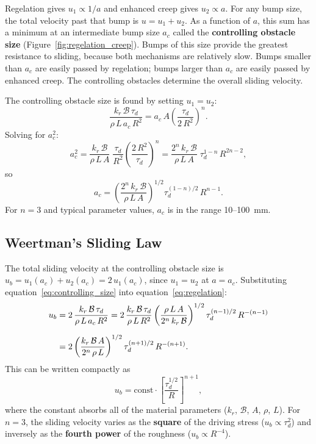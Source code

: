 \documentclass[11pt]{article}
\begin{document}
Regelation gives $u_1 \propto 1/a$ and enhanced creep gives $u_2 \propto a$.  For any bump size, the total velocity past that bump is $u = u_1 + u_2$.  As a function of $a$, this sum has a minimum at an intermediate bump size $a_c$ called the \textbf{controlling obstacle size} (Figure~\ref{fig:regelation_creep}).  Bumps of this size provide the greatest resistance to sliding, because both mechanisms are relatively slow.  Bumps smaller than $a_c$ are easily passed by regelation; bumps larger than $a_c$ are easily passed by enhanced creep.  The controlling obstacles determine the overall sliding velocity.

\medskip
\noindent The controlling obstacle size is found by setting $u_1 = u_2$:
\begin{equation}
  \frac{k_r\,\mathcal{B}\,\tau_d}{\rho\,L\,a_c\,R^2} = a_c\,A\left(\frac{\tau_d}{2\,R^2}\right)^n.
  \label{eq:ac_balance}
\end{equation}
Solving for $a_c^2$:
\begin{equation}
  a_c^2 = \frac{k_r\,\mathcal{B}}{\rho\,L\,A}\;\frac{\tau_d}{R^2}\left(\frac{2\,R^2}{\tau_d}\right)^n
  = \frac{2^n\,k_r\,\mathcal{B}}{\rho\,L\,A}\;\tau_d^{1-n}\,R^{2n-2},
\end{equation}
so
\begin{equation}
  a_c = \left(\frac{2^n\,k_r\,\mathcal{B}}{\rho\,L\,A}\right)^{1/2}\tau_d^{(1-n)/2}\,R^{n-1}.
  \label{eq:controlling_size}
\end{equation}
For $n = 3$ and typical parameter values, $a_c$ is in the range 10--100~mm.

\subsection{Weertman's Sliding Law}
\label{sec:weertman_law_derivation}

The total sliding velocity at the controlling obstacle size is $u_b = u_1(a_c) + u_2(a_c) = 2\,u_1(a_c)$, since $u_1 = u_2$ at $a = a_c$.  Substituting equation~\eqref{eq:controlling_size} into equation~\eqref{eq:regelation}:
\begin{align}
  u_b &= 2\,\frac{k_r\,\mathcal{B}\,\tau_d}{\rho\,L\,a_c\,R^2}
  = 2\,\frac{k_r\,\mathcal{B}\,\tau_d}{\rho\,L\,R^2}\left(\frac{\rho\,L\,A}{2^n\,k_r\,\mathcal{B}}\right)^{1/2}\tau_d^{(n-1)/2}\,R^{-(n-1)} \notag \\[6pt]
  &= 2\left(\frac{k_r\,\mathcal{B}\,A}{2^n\,\rho\,L}\right)^{1/2}\tau_d^{(n+1)/2}\,R^{-(n+1)}.
  \label{eq:weertman_derived}
\end{align}
This can be written compactly as
\begin{equation}
  \boxed{u_b = \text{const}\cdot\left[\frac{\tau_d^{1/2}}{R}\right]^{n+1},}
  \label{eq:weertman_sliding}
\end{equation}
where the constant absorbs all of the material parameters ($k_r$, $\mathcal{B}$, $A$, $\rho$, $L$).  For $n = 3$, the sliding velocity varies as the \textbf{square} of the driving stress ($u_b \propto \tau_d^2$) and inversely as the \textbf{fourth power} of the roughness ($u_b \propto R^{-4}$).
\end{document}
